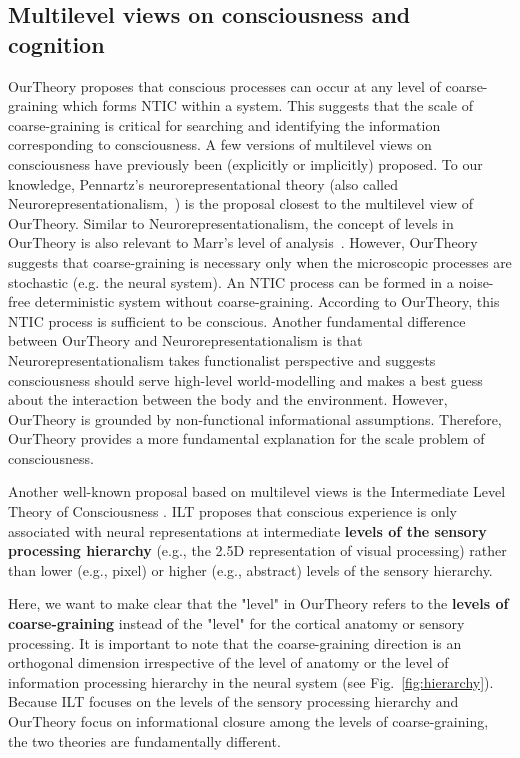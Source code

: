\documentclass[utf8]{article}
\begin{document}
        \subsection{Multilevel views on consciousness and cognition}\label{sec:MultiLevelView}
    		\ac{OurTheory} proposes that conscious processes can occur at any level of coarse-graining which forms NTIC within a system. This suggests that the scale of coarse-graining is critical for searching and identifying the information corresponding to consciousness. A few versions of multilevel views on consciousness have previously been (explicitly or implicitly) proposed. To our knowledge, Pennartz's neurorepresentational theory (also called Neurorepresentationalism,~\citep{pennartz2018consciousness,pennartz2015brain}) is the proposal closest to the multilevel view of \ac{OurTheory}. Similar to Neurorepresentationalism, the concept of levels in \ac{OurTheory} is also relevant to Marr's level of analysis~\citep{marr1982vision, pennartz2015brain, pennartz2018consciousness}. 
    		However, \ac{OurTheory} suggests that coarse-graining is necessary only when the microscopic processes are stochastic (e.g. the neural system). An NTIC process can be formed in a noise-free deterministic system without coarse-graining. According to \ac{OurTheory}, this NTIC process is sufficient to be conscious. 
    		Another fundamental difference between \ac{OurTheory} and Neurorepresentationalism is that Neurorepresentationalism takes functionalist perspective and suggests consciousness should serve high-level world-modelling and makes a best guess about the interaction between the body and the environment. 
    		However, \ac{OurTheory} is grounded by non-functional informational assumptions. Therefore, \ac{OurTheory} provides a more fundamental explanation for the scale problem of consciousness. 
    		
    		Another well-known proposal based on multilevel views is the Intermediate Level Theory of Consciousness \citep[ILT]{prinz2007intermediate, jackendoff1987consciousness}. ILT proposes that conscious experience is only associated with neural representations at intermediate \textbf{levels of the sensory processing hierarchy} (e.g., the 2.5D representation of visual processing) rather than lower (e.g., pixel) or higher (e.g., abstract) levels of the sensory hierarchy. 
    	
    		Here, we want to make clear that the "level" in \ac{OurTheory} refers to the \textbf{levels of coarse-graining} instead of the "level" for the cortical anatomy or sensory processing. It is important to note that the coarse-graining direction is an orthogonal dimension irrespective of the level of anatomy or the level of information processing hierarchy in the neural system (see Fig.~\ref{fig:hierarchy}). Because ILT focuses on the levels of the sensory processing hierarchy and \ac{OurTheory} focus on informational closure among the levels of coarse-graining, the two theories are fundamentally different.  
    		
\end{document}
